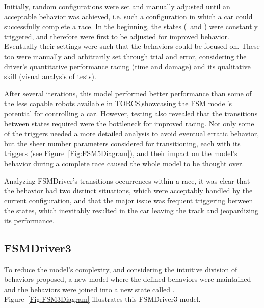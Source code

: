 %



Initially, random configurations were set and manually adjusted until an acceptable behavior was achieved, i.e. such a configuration in which a car could successfully complete a race. In the beginning, the  states (\OT~and \St) were constantly triggered, and therefore were first to be adjusted for improved behavior. Eventually their settings were such that the  behaviors could be focused on. These too were manually and arbitrarily set through trial and error, considering the driver's quantitative performance racing (time and damage) and its qualitative skill (visual analysis of tests).

After several iterations, this model performed better performance than some of the less capable robots available in TORCS,showcasing the FSM model's potential for controlling a car. However, testing also revealed that the transitions between states required were the bottleneck for improved racing. Not only some of the triggers needed a more detailed analysis to avoid eventual erratic behavior, but the sheer number parameters considered for transitioning, each with its triggers (see Figure~\ref{Fig:FSM5Diagram}), and their impact on the model's behavior during a complete race caused the whole model to be thought over.

Analyzing FSMDriver's transitions occurrences within a race, it was clear that the  behavior had two distinct situations, which were acceptably handled by the current configuration, and that the major issue was frequent triggering between the  states, which inevitably resulted in the car leaving the track and jeopardizing its performance.

\subsection{FSMDriver3}%
To reduce the model's complexity, and considering the intuitive division of behaviors proposed, a new model where the defined  behaviors were maintained and the  behaviors were joined into a new state called \IT. Figure~\ref{Fig:FSM3Diagram} illustrates this FSMDriver3 model.

